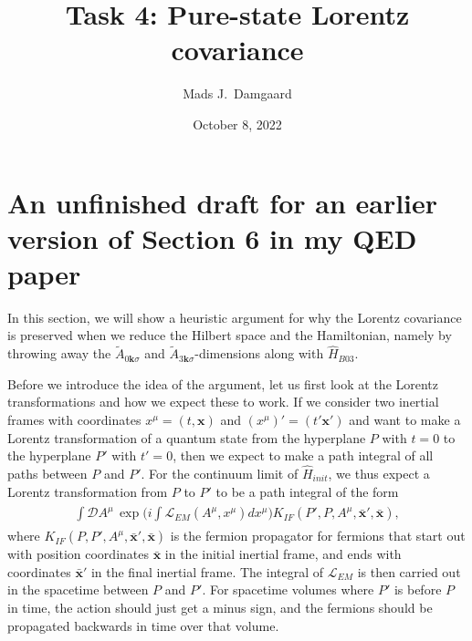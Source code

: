 \documentclass{article}
\title{Task 4: Pure-state Lorentz covariance}
\author{Mads J.\ Damgaard}
\date{ October 8, 2022 }%
\begin{document}
\maketitle




\section*{An unfinished draft for an earlier version of Section 6 in my QED paper}

In this section, we will show a heuristic argument for why the Lorentz covariance is preserved when we reduce the Hilbert space and the Hamiltonian, namely by throwing away the $\widetilde A_{0\mathbf{k}\sigma}$ and $\widetilde A_{3\mathbf{k}\sigma}$-dimensions along with $\hat H_{B03}$. 

Before we introduce the idea of the argument, let us first look at the Lorentz transformations and how we expect these to work. If we consider two inertial frames with coordinates $x^\mu = (t, \mathbf{x})$ and $(x^\mu)' = (t' \mathbf{x}')$ and want to make a Lorentz transformation of a quantum state from the hyperplane $P$ with $t=0$ to the hyperplane $P'$ with $t'=0$, then we expect to make a path integral of all paths between $P$ and $P'$. 
For the continuum limit of $\hat H_{init}$, we thus expect a Lorentz transformation from $P$ to $P'$ to be a path integral of the form
\begin{align}
\begin{aligned}
	\int \mathcal{D}A^\mu\,
		\exp\Big( i\int \mathcal{L}_{EM}(A^\mu, x^\mu) dx^\mu \Big)
		K_{IF}(P', P, A^\mu, \mathbf{\bar x}', \mathbf{\bar x}),
	\label{Lo_trans_form_01}
\end{aligned}
\end{align}
where $K_{IF}(P, P', A^\mu, \mathbf{\bar x}', \mathbf{\bar x})$ is the fermion propagator for fermions that start out with position coordinates $\mathbf{\bar x}$ in the initial inertial frame, and ends with coordinates $\mathbf{\bar x}'$ in the final inertial frame. 
The integral of $\mathcal{L}_{EM}$ is then carried out in the spacetime between $P$ and $P'$. For spacetime volumes where $P'$ is before $P$ in time, the action should just get a minus sign, and the fermions should be propagated backwards in time over that volume. 
\end{document}
